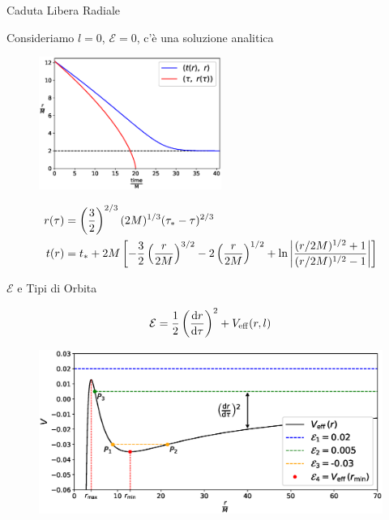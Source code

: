 \begin{frame}{Caduta Libera Radiale}

    Consideriamo $l = 0$, $\mathcal E = 0$, c'è una soluzione analitica

    \begin{figure}
        \includegraphics[width=0.53\textwidth]{Figures/ch1/radial_infall.eps}
    \end{figure}

    \begin{align*}
        r(\tau) &= \left(\frac{3}{2}\right)^{2/3}
        (2M)^{1/3} (\tau_* - \tau)^{2/3} \\
        t (r) &= t_* + 2M \left[ -\frac{3}{2} \left(\frac{r}{2M}\right)^{3/2}
        - 2 \left(\frac{r}{2M}\right)^{1/2}
        + \ln \abs{\frac{(r/2M)^{1/2} + 1}{(r/2M)^{1/2} - 1}} \right]
    \end{align*}

\end{frame}


\begin{frame}{$\mathcal E$ e Tipi di Orbita}

    \begin{equation*}
        \mathcal E = \frac{1}{2} \left( \dv{r}{\tau} \right)^2 + V_{\rm eff}(r, l)
    \end{equation*}

    \begin{figure}
        \centering
        \includegraphics[width=\textwidth]{Figures/ch1/V_eff_orbits.eps}
    \end{figure}

\end{frame}


